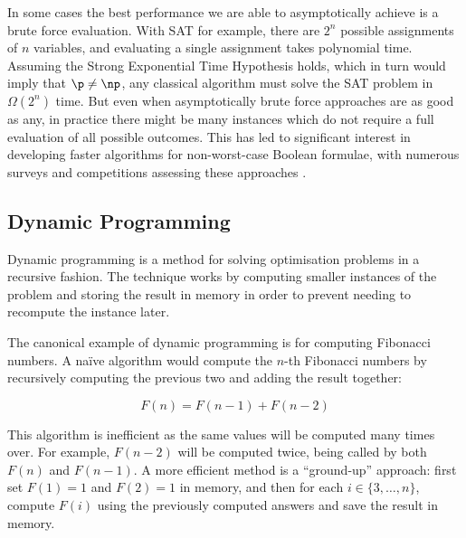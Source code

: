 In some cases the best performance we are able to asymptotically achieve is a brute force evaluation. With SAT for example, there are $2^n$ possible assignments of $n$ variables, and evaluating a single assignment takes polynomial time. Assuming the Strong Exponential Time Hypothesis holds, which in turn would imply that $\p \neq \np$, any classical algorithm must solve the SAT problem in $\Omega(2^n)$ time. But even when asymptotically brute force approaches are as good as any, in practice there might be many instances which do not require a full evaluation of all possible outcomes. This has led to significant interest in developing faster algorithms for non-worst-case Boolean formulae, with numerous surveys and competitions assessing these approaches \cite{sohanghpurwala2017, sat18}.

\subsection{Dynamic Programming}

Dynamic programming is a method for solving optimisation problems in a recursive fashion. The technique works by computing smaller instances of the problem and storing the result in memory in order to prevent needing to recompute the instance later.

The canonical example of dynamic programming is for computing Fibonacci numbers. A na\"{i}ve algorithm would compute the $n$-th Fibonacci numbers by recursively computing the previous two and adding the result together:

$$F(n) = F(n-1) + F(n-2)$$

This algorithm is inefficient as the same values will be computed many times over. For example, $F(n-2)$ will be computed twice, being called by both $F(n)$ and $F(n-1)$. A more efficient method is a ``ground-up'' approach: first set $F(1)=1$ and $F(2)=1$ in memory, and then for each $i \in \{3,\dots,n\}$, compute $F(i)$ using the previously computed answers and save the result in memory.

